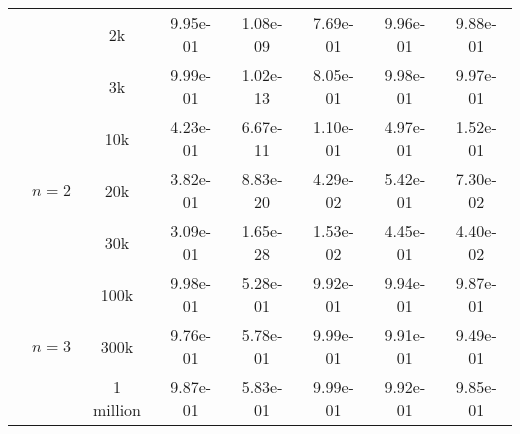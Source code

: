 \begin{table*}[t]
{\begin{tabular}{cccccccc}
        & & 2k & 9.95e-01 & \cellcolor{blue!30}1.08e-09 & 7.69e-01 & 9.96e-01 & 9.88e-01 \\
        & & 3k & 9.99e-01 & \cellcolor{blue!30}1.02e-13 & 8.05e-01 & 9.98e-01 & 9.97e-01 \\
        \cmidrule{2-8}
        & \multirow{3}{*}{$n=2$} & 10k & 4.23e-01 & \cellcolor{blue!30}6.67e-11 & 1.10e-01 & 4.97e-01 & 1.52e-01 \\
        & & 20k & 3.82e-01 & \cellcolor{blue!30}8.83e-20 & 4.29e-02 & 5.42e-01 & 7.30e-02 \\
        & & 30k & 3.09e-01 & \cellcolor{blue!30}1.65e-28 & 1.53e-02 & 4.45e-01 & 4.40e-02 \\
        \cmidrule{2-8}
        & \multirow{3}{*}{$n=3$} & 100k & 9.98e-01 & 5.28e-01 & 9.92e-01 & 9.94e-01 & 9.87e-01\\
        & & 300k & 9.76e-01 & 5.78e-01 & 9.99e-01 & 9.91e-01 & 9.49e-01\\
        & & 1 million & 9.87e-01 & 5.83e-01 & 9.99e-01 & 9.92e-01 & 9.85e-01\\
        \bottomrule
    \end{tabular}
    }
    \label{tab:removal}
\end{table*}